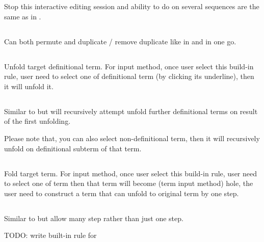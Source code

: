 \documentclass[master.tex]{subfiles}
\begin{document}
Stop this interactive editing session and ability to do on several sequences are the same as in .

\subsection{}
Can both permute and duplicate / remove duplicate like in  and  in one go.


\subsection{}
Unfold target definitional term. For input method, once user select this build-in rule, user need to select one of definitional term (by clicking its underline), then it will unfold it.


\subsection{}
Similar to  but will recursively attempt unfold further definitional terms on result of the first unfolding.

Please note that, you can also select non-definitional term, then it will recursively unfold on definitional subterm of that term.

\subsection{}
Fold target term. For input method, once user select this build-in rule, user need to select one of term then that term will become (term input method) hole, the user need to construct a term that can unfold to original term by one step.

\subsection{}
Similar to  but allow many step rather than just one step.

TODO: write built-in rule for \kDictionary
\end{document}
